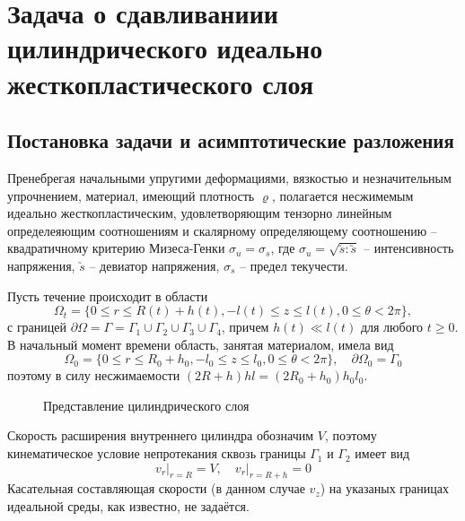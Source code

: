 \chapter{Задача о сдавливаниии цилиндрического идеально жесткопластического слоя}\label{ch:ch2}

\section{Постановка задачи и асимптотические разложения}\label{sec:ch2/sec1}

Пренебрегая начальными упругими деформациями, вязкостью и незначительным упрочнением, материал, имеющий плотность $\varrho$, полагается несжимемым идеально жесткопластическим, удовлетворяющим тензорно линейным определеяющим соотношениям и скалярному определяющему соотношению -- квадратичному критерию Мизеса-Генки $\sigma_{u} = \sigma_{s}$, где $\sigma_{u} = \sqrt{\utilde{s} : \utilde{s}}$ -- интенсивность напряжения, $\utilde{s}$ -- девиатор напряжения, $\sigma_{s}$ -- предел текучести.

Пусть течение происходит в области
\begin{equation}
  \Omega_{t} = \{0 \le r \le R(t) + h(t), -l(t) \le z \le l(t), 0 \le \theta < 2\pi\},
\end{equation}
с границей $\partial\Omega = \Gamma = \Gamma_{1} \cup \Gamma_{2} \cup \Gamma_{3}\cup \Gamma_{4}$, причем $h(t) \ll l(t)$ для любого $t \ge 0$. В начальный момент времени область, занятая материалом, имела вид
\begin{equation}
  \Omega_{0} = \{0 \le r \le R_{0} + h_{0}, -l_{0} \le z \le l_{0}, 0 \le \theta < 2\pi\}, \quad \partial\Omega_{0} = \Gamma_{0}
\end{equation}
поэтому в силу несжимаемости $(2R+h)hl=(2R_{0}+h_{0})h_{0}l_{0}$.

\begin{figure}[ht]
    \caption{Представление цилиндрического слоя}
    \label{fig:ch2/layer}
\end{figure}
Скорость расширения внутреннего цилиндра обозначим $V$, поэтому кинематическое условие непротекания сквозь границы $\Gamma_{1}$ и $\Gamma_{2}$ имеет вид
\begin{equation}
  \label{eq:ch2/sec1/boundary/kinematic}
  v_{r}\lvert_{r=R} = V, \quad v_{r}\lvert_{r=R+h} = 0
\end{equation}
Касательная составляющая скорости (в данном случае $v_{z}$) на указаных границах идеальной среды, как известно, не задаётся.

